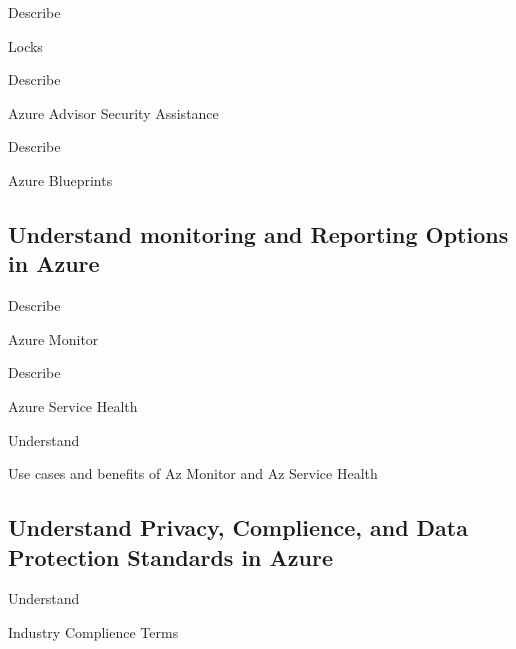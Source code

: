\documentclass{scrartcl}
\newenvironment{flashcard}[2][]{%
    #1
    \vfill
    \centerline{\Large{#2}}
    \vfill
\newpage
}
{\newpage}
\newcommand{\subsectioncard}[1]{
    \vspace*{\stretch{1}}
    \subsection{#1}
    \vspace*{\stretch{1}}
    \pagebreak
}
\begin{document}
    \begin{flashcard}[Describe]{Locks}

    \end{flashcard}

    \begin{flashcard}[Describe]{Azure Advisor Security Assistance}

    \end{flashcard}

    \begin{flashcard}[Describe]{Azure Blueprints}

    \end{flashcard}

    \subsectioncard{Understand monitoring and Reporting Options in Azure}

    \begin{flashcard}[Describe]{Azure Monitor}

    \end{flashcard}

    \begin{flashcard}[Describe]{Azure Service Health}

    \end{flashcard}

    \begin{flashcard}[Understand]{Use cases and benefits of Az Monitor and Az Service Health}

    \end{flashcard}

    \subsectioncard{Understand Privacy, Complience, and Data Protection Standards in Azure}

    \begin{flashcard}[Understand]{Industry Complience Terms}

    \end{flashcard}
\end{document}
